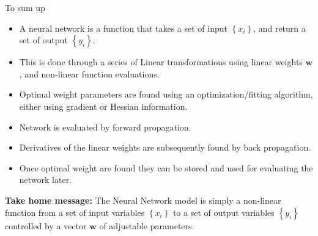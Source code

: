 \documentclass[]{beamer}
\begin{document}
\begin{frame}
   {To sum up}
   \scriptsize
   \begin{itemize}
      \item
      A neural network is a function that takes a set of input $\left\lbrace x_i \right\rbrace$, and return a set of output $\left\lbrace y_i \right\rbrace$.
      \item
      This is done through a series of Linear transformations using linear weights $\boldsymbol{w}$, and non-linear function evaluations.
      \item
      Optimal weight parameters are found using an optimization/fitting algorithm, either using gradient or Hessian information.
      \item
      Network is evaluated by forward propagation.
      \item
      Derivatives of the linear weights are subsequently found by back propagation.
      \item
      Once optimal weight are found they can be stored and used for evaluating the network later.
   \end{itemize}
   
   \vspace{0.7cm}
   \begin{center}
      \normalsize
      \textbf{Take home message:} The Neural Network model is simply a non-linear function from a set of input variables $\left\lbrace x_i \right\rbrace$ to a set of output variables $\left\lbrace y_i \right\rbrace$ controlled by a vector $\boldsymbol{w}$ of adjustable parameters.
   \end{center}
\end{frame}
\end{document}
